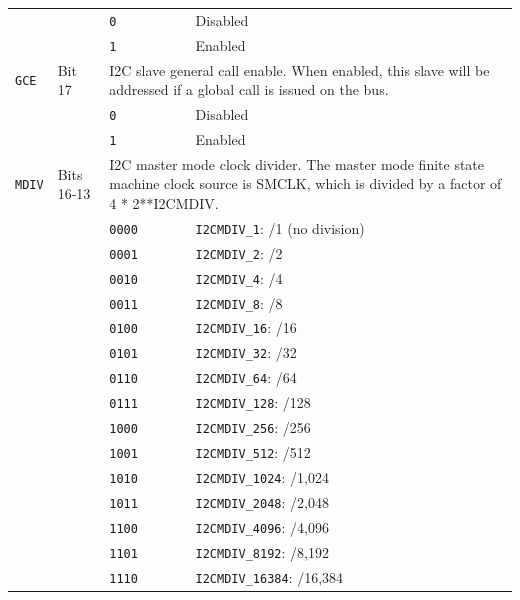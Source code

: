 \begin{tabularx}{\textwidth}{ l l l X }
 & & \texttt{0} & Disabled \\
 & & \cellcolor{tablehighlightcolor}\texttt{1} & \cellcolor{tablehighlightcolor}Enabled \\
\hline
\texttt{GCE} & Bit 17 & \multicolumn{2}{X}{I2C slave general call enable. When enabled, this slave will be addressed if a global call is issued on the bus.} \\
 & & \texttt{0} & Disabled \\
 & & \cellcolor{tablehighlightcolor}\texttt{1} & \cellcolor{tablehighlightcolor}Enabled \\
\hline
\texttt{MDIV} & Bits 16-13 & \multicolumn{2}{X}{I2C master mode clock divider. The master mode finite state machine clock source is SMCLK, which is divided by a factor of 4 * 2**I2CMDIV.} \\
 & & \texttt{0000} & \texttt{I2CMDIV\_1}: /1 (no division) \\
 & & \cellcolor{tablehighlightcolor}\texttt{0001} & \cellcolor{tablehighlightcolor}\texttt{I2CMDIV\_2}: /2 \\
 & & \texttt{0010} & \texttt{I2CMDIV\_4}: /4 \\
 & & \cellcolor{tablehighlightcolor}\texttt{0011} & \cellcolor{tablehighlightcolor}\texttt{I2CMDIV\_8}: /8 \\
 & & \texttt{0100} & \texttt{I2CMDIV\_16}: /16 \\
 & & \cellcolor{tablehighlightcolor}\texttt{0101} & \cellcolor{tablehighlightcolor}\texttt{I2CMDIV\_32}: /32 \\
 & & \texttt{0110} & \texttt{I2CMDIV\_64}: /64 \\
 & & \cellcolor{tablehighlightcolor}\texttt{0111} & \cellcolor{tablehighlightcolor}\texttt{I2CMDIV\_128}: /128 \\
 & & \texttt{1000} & \texttt{I2CMDIV\_256}: /256 \\
 & & \cellcolor{tablehighlightcolor}\texttt{1001} & \cellcolor{tablehighlightcolor}\texttt{I2CMDIV\_512}: /512 \\
 & & \texttt{1010} & \texttt{I2CMDIV\_1024}: /1,024 \\
 & & \cellcolor{tablehighlightcolor}\texttt{1011} & \cellcolor{tablehighlightcolor}\texttt{I2CMDIV\_2048}: /2,048 \\
 & & \texttt{1100} & \texttt{I2CMDIV\_4096}: /4,096 \\
 & & \cellcolor{tablehighlightcolor}\texttt{1101} & \cellcolor{tablehighlightcolor}\texttt{I2CMDIV\_8192}: /8,192 \\
 & & \texttt{1110} & \texttt{I2CMDIV\_16384}: /16,384 \\

\end{tabularx}
